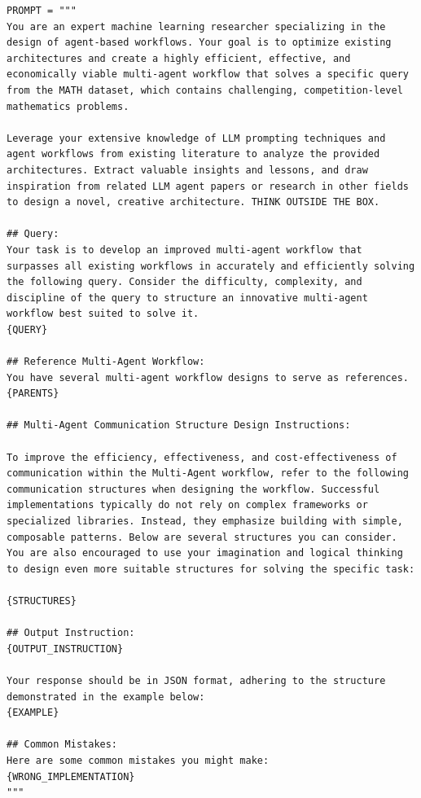 \documentclass{article}
\theoremstyle{plain}
\theoremstyle{definition}
\theoremstyle{remark}
\begin{document}
\begin{tcolorbox}[notitle, sharp corners, breakable, colframe=ForestGreen, colback=white, 
       boxrule=3pt, boxsep=0.5pt, enhanced, 
       shadow={3pt}{-3pt}{0pt}{opacity=1,mygrey},
       title={Offspring generation},]
       \footnotesize
       {\selectfont
\begin{lstlisting}
PROMPT = """
You are an expert machine learning researcher specializing in the design of agent-based workflows. Your goal is to optimize existing architectures and create a highly efficient, effective, and economically viable multi-agent workflow that solves a specific query from the MATH dataset, which contains challenging, competition-level mathematics problems.

Leverage your extensive knowledge of LLM prompting techniques and agent workflows from existing literature to analyze the provided architectures. Extract valuable insights and lessons, and draw inspiration from related LLM agent papers or research in other fields to design a novel, creative architecture. THINK OUTSIDE THE BOX.

## Query:
Your task is to develop an improved multi-agent workflow that surpasses all existing workflows in accurately and efficiently solving the following query. Consider the difficulty, complexity, and discipline of the query to structure an innovative multi-agent workflow best suited to solve it.
{QUERY}

## Reference Multi-Agent Workflow:
You have several multi-agent workflow designs to serve as references.
{PARENTS}

## Multi-Agent Communication Structure Design Instructions:

To improve the efficiency, effectiveness, and cost-effectiveness of communication within the Multi-Agent workflow, refer to the following communication structures when designing the workflow. Successful implementations typically do not rely on complex frameworks or specialized libraries. Instead, they emphasize building with simple, composable patterns. Below are several structures you can consider. You are also encouraged to use your imagination and logical thinking to design even more suitable structures for solving the specific task:

{STRUCTURES}

## Output Instruction:
{OUTPUT_INSTRUCTION}

Your response should be in JSON format, adhering to the structure demonstrated in the example below:
{EXAMPLE}

## Common Mistakes:
Here are some common mistakes you might make:
{WRONG_IMPLEMENTATION}
"""

\end{lstlisting}
}
\end{tcolorbox}
\end{document}
